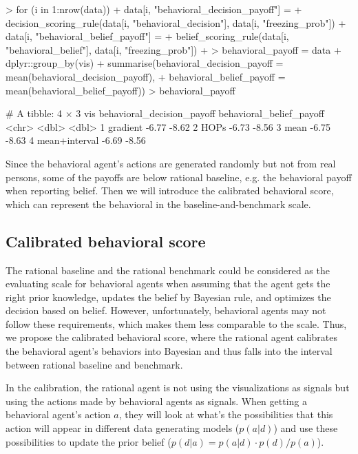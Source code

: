 \documentclass{article}
\begin{document}
\begin{Schunk}
\begin{Sinput}
> for (i in 1:nrow(data)) {
+   data[i, "behavioral_decision_payoff"] = 
+     decision_scoring_rule(data[i, "behavioral_decision"], data[i, "freezing_prob"])
+   data[i, "behavioral_belief_payoff"] = 
+     belief_scoring_rule(data[i, "behavioral_belief"], data[i, "freezing_prob"])
+ }
> behavioral_payoff = data %>%
+   dplyr::group_by(vis) %>%
+   summarise(behavioral_decision_payoff = mean(behavioral_decision_payoff),
+             behavioral_belief_payoff = mean(behavioral_belief_payoff))
> behavioral_payoff
\end{Sinput}
\begin{Soutput}
# A tibble: 4 × 3
  vis           behavioral_decision_payoff behavioral_belief_payoff
  <chr>                              <dbl>                    <dbl>
1 gradient                           -6.77                    -8.62
2 HOPs                               -6.73                    -8.56
3 mean                               -6.75                    -8.63
4 mean+interval                      -6.69                    -8.56
\end{Soutput}
\end{Schunk}

Since the behavioral agent's actions are generated randomly but not from real persons, some of the payoffs are below rational baseline, e.g. the behavioral payoff when reporting belief. Then we will introduce the calibrated behavioral score, which can represent the behavioral in the baseline-and-benchmark scale.

\subsection{Calibrated behavioral score}

The rational baseline and the rational benchmark could be considered as the evaluating scale for behavioral agents when assuming that the agent gets the right prior knowledge, updates the belief by Bayesian rule, and optimizes the decision based on belief. However, unfortunately, behavioral agents may not follow these requirements, which makes them less comparable to the scale. Thus, we propose the calibrated behavioral score, where the rational agent calibrates the behavioral agent's behaviors into Bayesian and thus falls into the interval between rational baseline and benchmark.

In the calibration, the rational agent is not using the visualizations as signals but using the actions made by behavioral agents as signals. When getting a behavioral agent's action $a$, they will look at what's the possibilities that this action will appear in different data generating models ($p(a|d)$) and use these possibilities to update the prior belief ($p(d|a) = p(a|d) \cdot p(d) / p(a)$).
\end{document}
